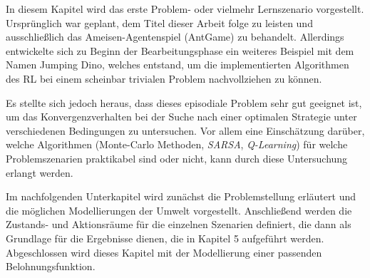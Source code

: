 In diesem Kapitel wird das erste Problem- oder vielmehr Lernszenario vorgestellt. Ursprünglich war geplant, dem Titel dieser Arbeit folge zu leisten und ausschließlich das Ameisen-Agentenspiel (\glqq AntGame\grqq{}) zu behandelt. Allerdings entwickelte sich zu Beginn der Bearbeitungsphase ein weiteres Beispiel mit dem Namen \glqq Jumping Dino\grqq{}, welches entstand, um die implementierten Algorithmen des RL bei einem scheinbar trivialen Problem nachvollziehen zu können.
\par 
Es stellte sich jedoch heraus, dass dieses episodiale Problem sehr gut geeignet ist, um das Konvergenzverhalten bei der Suche nach einer optimalen Strategie unter verschiedenen Bedingungen zu untersuchen. Vor allem eine Einschätzung darüber, welche Algorithmen (Monte-Carlo Methoden, \textit{SARSA}, \textit{Q-Learning}) für welche Problemszenarien praktikabel sind oder nicht, kann durch diese Untersuchung erlangt werden. 
\par 
Im nachfolgenden Unterkapitel wird zunächst die Problemstellung erläutert und die möglichen Modellierungen der Umwelt vorgestellt. Anschließend werden die Zustands- und Aktionsräume für die einzelnen Szenarien definiert, die dann als Grundlage für die Ergebnisse dienen, die in Kapitel 5 aufgeführt werden. Abgeschlossen wird dieses Kapitel mit der Modellierung einer passenden Belohnungsfunktion.

